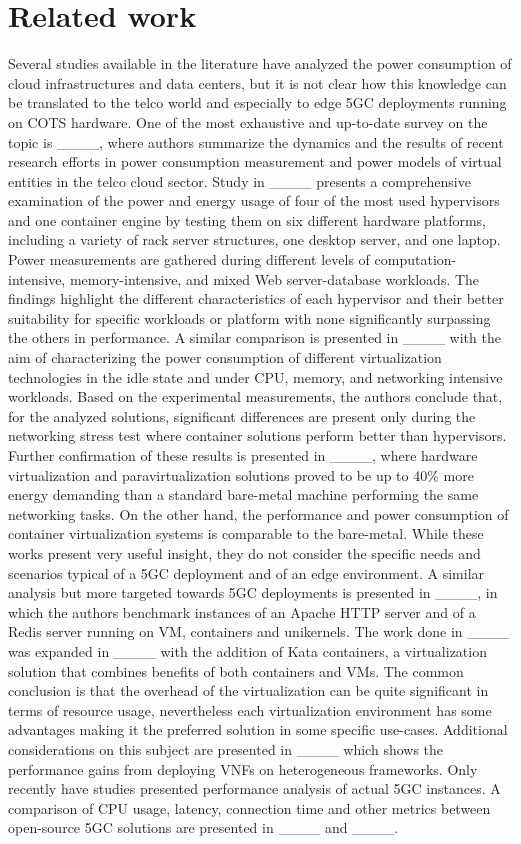 \section{Related work}
\label{sec:Related_work}

Several studies available in the literature have analyzed the power consumption of cloud infrastructures and data centers, but it is not clear how this knowledge can be translated to the telco world and especially to edge 5GC deployments running on COTS hardware.
One of the most exhaustive and up-to-date survey on the topic is ____, where authors summarize the dynamics and the results of recent research efforts in power consumption measurement and power models of virtual entities in the telco cloud sector.
Study in ____ presents a comprehensive examination of the power and energy usage of four of the most used hypervisors and one container engine by testing them on six different hardware platforms, including a variety of rack server structures, one desktop server, and one laptop. Power measurements are gathered during different levels of computation-intensive, memory-intensive, and mixed Web server-database workloads. The findings highlight the different characteristics of each hypervisor and their better suitability for specific workloads or platform with none significantly surpassing the others in performance.
A similar comparison is presented in ____ with the aim of characterizing the power consumption of different virtualization technologies in the idle state and under CPU, memory, and networking intensive workloads.
Based on the experimental measurements, the authors conclude that, for the analyzed solutions, significant differences are present only during the networking stress test where container solutions perform better than hypervisors.
Further confirmation of these results is presented in ____, where hardware virtualization and paravirtualization solutions proved to be up to 40\% more energy demanding than a standard bare-metal machine performing the same networking tasks. On the other hand, the performance and power consumption of container
virtualization systems is comparable to the bare-metal.
While these works present very useful insight, they do not consider the specific needs and scenarios typical of a 5GC deployment and of an edge environment.
A similar analysis but more targeted towards 5GC deployments is presented in ____, in which the authors benchmark instances of an Apache HTTP server and of a Redis server running on VM, containers and unikernels. The work done in ____ was expanded in ____ with the addition of Kata containers, a virtualization solution that combines benefits of both containers and VMs.
The common conclusion is that the overhead of the virtualization can be quite significant in terms of resource usage, nevertheless each virtualization environment has some advantages making it the preferred solution in some specific use-cases.
Additional considerations on this subject are presented in ____ which shows the performance gains from deploying VNFs on heterogeneous frameworks.
Only recently have studies presented performance analysis of actual 5GC instances. A comparison of CPU usage, latency, connection time and other metrics between open-source 5GC solutions are presented in ____ and ____.

